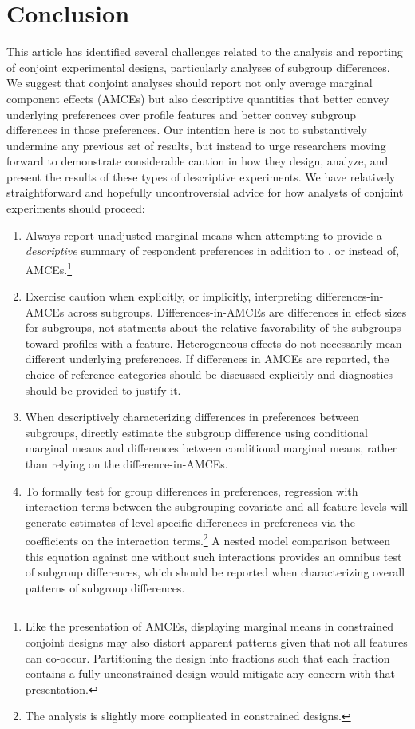 \documentclass[a4paper,12pt]{article}\usepackage[]{graphicx}\usepackage[]{color}
\begin{document}
\section*{Conclusion}\label{sec:conclusion}

This article has identified several challenges related to the analysis and reporting of conjoint experimental designs, particularly analyses of subgroup differences. We suggest that conjoint analyses should report not only average marginal component effects (AMCEs) but also descriptive quantities that better convey underlying preferences over profile features and better convey subgroup differences in those preferences. Our intention here is not to substantively undermine any previous set of results, but instead to urge researchers moving forward to demonstrate considerable caution in how they design, analyze, and present the results of these types of descriptive experiments. We have relatively straightforward and hopefully uncontroversial advice for how analysts of conjoint experiments should proceed:

\begin{enumerate}
\item Always report unadjusted marginal means when attempting to provide a \textit{descriptive} summary of respondent preferences in addition to , or instead of, AMCEs.\footnote{Like the presentation of AMCEs, displaying marginal means in constrained conjoint designs may also distort apparent patterns given that not all features can co-occur. Partitioning the design into fractions such that each fraction contains a fully unconstrained design would mitigate any concern with that presentation.}

\item Exercise caution when explicitly, or implicitly, interpreting differences-in-AMCEs across subgroups. Differences-in-AMCEs are differences in effect sizes for subgroups, not statments about the relative favorability of the subgroups toward profiles with a feature. Heterogeneous effects do not necessarily mean different underlying preferences. If differences in AMCEs are reported, the choice of reference categories should be discussed explicitly and diagnostics should be provided to justify it.

\item When descriptively characterizing differences in preferences between subgroups, directly estimate the subgroup difference using conditional marginal means and differences between conditional marginal means, rather than relying on the difference-in-AMCEs.

\item To formally test for group differences in preferences, regression with interaction terms between the subgrouping covariate and all feature levels will generate estimates of level-specific differences in preferences via the coefficients on the interaction terms.\footnote{The analysis is slightly more complicated in constrained designs.} A nested model comparison between this equation against one without such interactions provides an omnibus test of subgroup differences, which should be reported when characterizing overall patterns of subgroup differences.
\end{enumerate}
\end{document}

